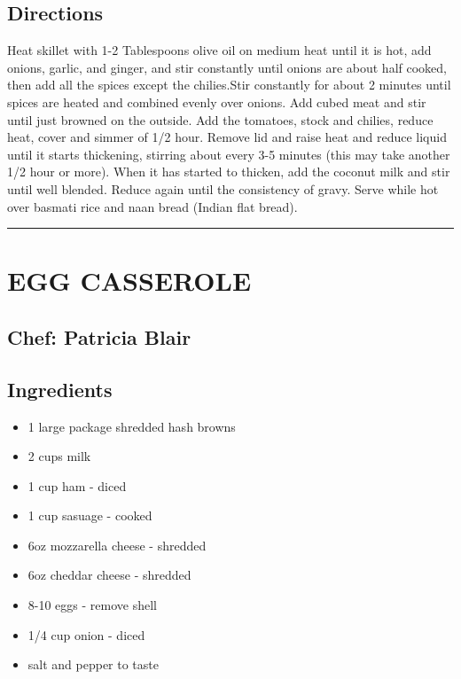 \documentclass[
]{book}
\providecommand{\tightlist}{%
  \setlength{\itemsep}{0pt}\setlength{\parskip}{0pt}}
\begin{document}
\hypertarget{directions-54}{%
\subsection*{Directions}\label{directions-54}}


Heat skillet with 1-2 Tablespoons olive oil on medium heat until it is hot, add onions, garlic, and ginger, and stir constantly until onions are about half cooked, then add all the spices except the chilies.Stir constantly for about 2 minutes until spices are heated and combined evenly over onions. Add cubed meat and stir until just browned on the outside. Add the tomatoes, stock and chilies, reduce heat, cover and simmer of 1/2 hour. Remove lid and raise heat and reduce liquid until it starts thickening, stirring about every 3-5 minutes (this may take another 1/2 hour or more). When it has started to thicken, add the coconut milk and stir until well blended. Reduce again until the consistency of gravy. Serve while hot over basmati rice and naan bread (Indian flat bread).

\begin{center}\rule{0.5\linewidth}{0.5pt}\end{center}

\hypertarget{egg-casserole}{%
\section*{EGG CASSEROLE}\label{egg-casserole}}


\hypertarget{chef-patricia-blair-11}{%
\subsection*{Chef: Patricia Blair}\label{chef-patricia-blair-11}}


\hypertarget{ingredients-55}{%
\subsection*{Ingredients}\label{ingredients-55}}


\begin{itemize}
\tightlist
\item
  1 large package shredded hash browns
\item
  2 cups milk
\item
  1 cup ham - diced
\item
  1 cup sasuage - cooked
\item
  6oz mozzarella cheese - shredded
\item
  6oz cheddar cheese - shredded
\item
  8-10 eggs - remove shell
\item
  1/4 cup onion - diced
\item
  salt and pepper to taste
\end{itemize}
\end{document}
